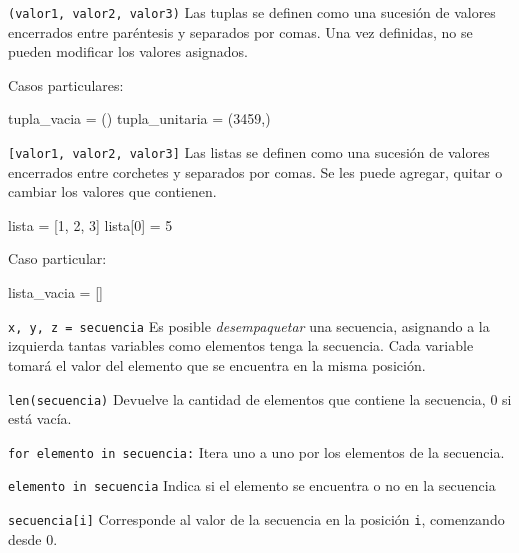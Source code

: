\begin{referencia_python}

\begin{sintaxis}{\lstinline!(valor1, valor2, valor3)!}
Las tuplas se definen como una sucesión de valores encerrados entre paréntesis
y separados por comas. Una vez definidas, no se pueden modificar los valores
asignados.

Casos particulares:
\begin{codigo-python-sn}
tupla_vacia = ()
tupla_unitaria = (3459,)
\end{codigo-python-sn}
\end{sintaxis}

\begin{sintaxis}{\lstinline![valor1, valor2, valor3]!}
Las listas se definen como una sucesión de valores encerrados entre corchetes y
separados por comas. Se les puede agregar, quitar o cambiar los valores que
contienen.

\begin{codigo-python-sn}
lista = [1, 2, 3]
lista[0] = 5
\end{codigo-python-sn}

Caso particular:
\begin{codigo-python-sn}
lista_vacia = []
\end{codigo-python-sn}
\end{sintaxis}

\begin{sintaxis}{\lstinline!x, y, z = secuencia!}
Es posible \emph{desempaquetar} una secuencia, asignando a la izquierda
tantas variables como elementos tenga la secuencia. Cada variable
tomará el valor del elemento que se encuentra en la misma posición.
\end{sintaxis}

\begin{sintaxis}{\lstinline!len(secuencia)!}
Devuelve la cantidad de elementos que contiene la secuencia, 0 si está vacía.
\end{sintaxis}

\begin{sintaxis}{\lstinline!for elemento in secuencia:!}
Itera uno a uno por los elementos de la secuencia.
\end{sintaxis}

\begin{sintaxis}{\lstinline!elemento in secuencia!}
Indica si el elemento se encuentra o no en la secuencia
\end{sintaxis}

\begin{sintaxis}{\lstinline!secuencia[i]!}
Corresponde al valor de la secuencia en la posición \lstinline!i!, comenzando
desde 0.


\end{sintaxis}
\end{referencia_python}
